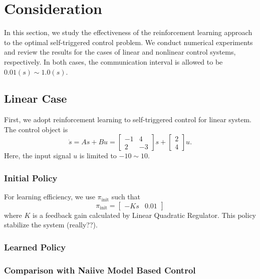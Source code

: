 \documentclass[english, dvipdfmx]{ampmt}             %
\begin{document}
\section{Consideration}
In this section, we study the effectiveness of the reinforcement learning approach to the optimal self-triggered control problem. We conduct numerical experiments and review the results for the cases of linear and nonlinear control systems, respectively. In both cases, the communication interval is allowed to be $0.01 (s) \sim 1.0 (s)$. 

\subsection{Linear Case}
First, we adopt reinforcement learning to self-triggered control for linear system. The control object is
\begin{equation}
	\dot{s} = As + Bu = \begin{bmatrix}-1& 4 \\ 2 & -3\end{bmatrix}s + \begin{bmatrix}2 \\ 4\end{bmatrix}u.
\end{equation}
Here, the input signal $u$ is limited to $-10 \sim 10$.

\subsubsection{Initial Policy}
For learning efficiency, we use $\pi_{\textrm{init}}$ such that
\begin{equation}
	\pi_{\textrm{init}} = \begin{bmatrix}-Ks&0.01\end{bmatrix}
\end{equation}
where $K$ is a feedback gain calculated by Linear Quadratic Regulator. This policy stabilize the system (really??).

\subsubsection{Learned Policy}

\subsubsection{Comparison with Naiive Model Based Control}
\end{document}
